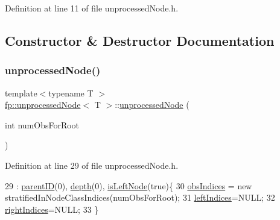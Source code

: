 Definition at line 11 of file unprocessed\+Node.\+h.



\subsection{Constructor \& Destructor Documentation}
\mbox{\label{classfp_1_1unprocessedNode_ae4835a9b488d992f299dbad40c943ae9}} 
\subsubsection{\texorpdfstring{unprocessed\+Node()}{unprocessedNode()}\hspace{0.1cm}{\footnotesize\ttfamily [1/2]}}
{\footnotesize\ttfamily template$<$typename T $>$ \\
\hyperlink{classfp_1_1unprocessedNode}{fp\+::unprocessed\+Node}$<$ T $>$\+::\hyperlink{classfp_1_1unprocessedNode}{unprocessed\+Node} (\begin{DoxyParamCaption}\item[{int}]{num\+Obs\+For\+Root }\end{DoxyParamCaption})\hspace{0.3cm}{\ttfamily [inline]}}



Definition at line 29 of file unprocessed\+Node.\+h.


\begin{DoxyCode}
29                                                   :  \hyperlink{classfp_1_1unprocessedNode_a74cb75f76c24622444e531a583b75c3d}{parentID}(0), \hyperlink{classfp_1_1unprocessedNode_a22ebfbc35a57e2d30b81220c94f4d0d3}{depth}(0), 
      \hyperlink{classfp_1_1unprocessedNode_a81b74c36ed1ac15d367e135e2fa0ba3d}{isLeftNode}(\textcolor{keyword}{true})\{
30                     \hyperlink{classfp_1_1unprocessedNode_aea171244695a3a099061188a9553e525}{obsIndices} = \textcolor{keyword}{new} stratifiedInNodeClassIndices(numObsForRoot);
31                     \hyperlink{classfp_1_1unprocessedNode_a0a147fea04670ff34ef0891a14ec67a3}{leftIndices}=NULL;
32                     \hyperlink{classfp_1_1unprocessedNode_a4e805660b305b1056cea187ed5584a1d}{rightIndices}=NULL;
33                 \}
\end{DoxyCode}
\mbox{\label{classfp_1_1unprocessedNode_ac8c960894806adf6ca652a60f5d11e4a}} 
